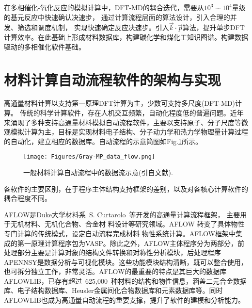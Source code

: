 在多相催化-氧化反应的模拟计算中，\textrm{DFT-MD}的耦合迭代，需要从$10^3\sim10^4$量级的基元反应中快速确认决速步，%
通过计算流程层面的算法设计，引入合理的并发、筛选和调度机制，%
实现快速确定反应决速步。引入$\vec k\cdot\vec p$算法，提升单步\textrm{DFT}计算效率。在此基础上形成材料数据库，构建碳化学和煤化工知识图谱。构建数据驱动的多相催化软件基础。

\section{材料计算自动流程软件的架构与实现}
高通量材料计算以支持第一原理\textrm{DFT}计算为主，少数可支持多尺度\textrm{(DFT-MD)}计算。%
传统的科学计算软件，存在人机交互频繁，自动化程度低的普遍问题。近年来涌现了多种支持高通量材料模拟自动流程软件，主要以支持原子、分子尺度等微观模拟计算为主，目标是实现材料电子结构、分子动力学和热力学物理量计算过程的自动化，建立相应的数据库。自动流程的示意简图如\textrm{Fig.}\ref{Fig:MP_data_flow}所示。
\begin{figure}[h!]
\centering
\texttt{[image: Figures/Gray-MP\_data\_flow.png]}%
\caption{一般材料计算自动流程中的数据流示意(引自文献\cite{CMS49-299_2010}).}%
\label{Fig:MP_data_flow}
\end{figure}
各软件的主要区别，在于程序主体结构支持框架的差别，以及对各核心计算软件的耦合程度不同。

\textrm{AFLOW}是\textrm{Duke}大学材料系~\textrm{S. Curtarolo}~等开发的高通量计算流程框架，%
主要用于无机材料、无机化合物、合金材 料设计等研究领域。AFLOW 转变了具体物性专门计算的传统模式，设定自动流程完成材料 物性系统计算。\textrm{AFLOW}框架中集成的第一原理计算程序包为\textrm{VASP}。除此之外，\textrm{AFLOW}主体程序分为两部分，前处理部分主要是计算对象的结构文件转换和对称性分析模块，后处理程序\textrm{APENNSY}是数据分析与可视化模块。这些功能模块结构清晰，既可以整合使用，也可拆分独立工作，非常灵活。\textrm{AFLOW}的最重要的特点是其巨大的数据库\textrm{AFLOWLIB}，已存有超过~625,000~种材料的结构和物性信息，涵盖二元合金数据库、电子结构数据库、\textrm{Heusler}金属间化合物数据库和元素数据库等。同时\textrm{AFLOWLIB}也成为高通量自动流程的重要支撑，提升了软件的建模和分析能力。

